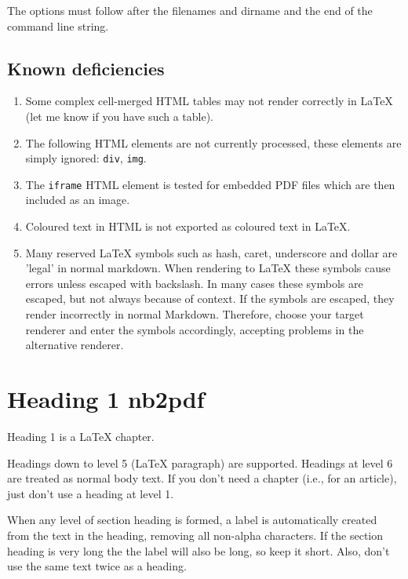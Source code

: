 \documentclass[english]{workpackage}[1996/06/02]
\begin{document}
The options must follow after the filenames and dirname and the end of the command line string.




\section{Known deficiencies}
\label{sec:Knowndeficiencies}

\begin{enumerate}
\item Some complex cell-merged HTML tables may not render correctly in LaTeX (let me know if you have such a table).
\item The following HTML elements are not currently processed, these elements are simply ignored: \verb+div+,  \verb+img+.
\item The \verb+iframe+ HTML element is tested for embedded PDF files which are then included as an image.
\item Coloured text in HTML is not exported as coloured text in LaTeX.
\item Many reserved LaTeX symbols such as hash, caret, underscore and dollar are 'legal' in normal markdown.  When rendering to LaTeX these symbols cause errors unless escaped with backslash.  In many cases these symbols are escaped, but not always because of context.  If the symbols are escaped, they render incorrectly in normal Markdown. Therefore, choose your target renderer and enter the symbols accordingly, accepting problems in the alternative renderer.
\end{enumerate}



\chapter{Heading 1 nb2pdf}
\label{sec:Heading1nb2pdf}


Heading 1 is a \LaTeX{} chapter.


Headings down to level 5 (\LaTeX{} paragraph) are supported. 
Headings at level 6 are treated as normal body text.
If you don't need a chapter (i.e., for an article), just don't use a heading at level 1.


When any level of section heading is formed, a label is automatically created from the text in the heading, removing all non-alpha characters.  If the section heading is very long the the label will also be long, so keep it short. Also, don't use the same text twice as a heading.
\end{document}
